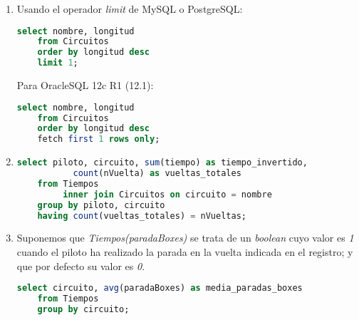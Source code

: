 \begin{enumerate}
	\item 
	Usando el operador \textit{limit} de MySQL o PostgreSQL:
	\begin{lstlisting}[language=sql]
	select nombre, longitud
	from Circuitos
	order by longitud desc
	limit 1;
	\end{lstlisting}
	
	Para OracleSQL 12c R1 (12.1):
	\begin{lstlisting}[language=sql]
	select nombre, longitud
	from Circuitos
	order by longitud desc
	fetch first 1 rows only;
	\end{lstlisting}
	
	\item
	\begin{lstlisting}[language=sql]
	select piloto, circuito, sum(tiempo) as tiempo_invertido, 
		   count(nVuelta) as vueltas_totales
	from Tiempos
		 inner join Circuitos on circuito = nombre
	group by piloto, circuito
	having count(vueltas_totales) = nVueltas;
	\end{lstlisting}
	
	\newpage
	\item
	Suponemos que \textit{Tiempos(paradaBoxes)} se trata de un \textit{boolean} cuyo valor
	es \textit{1} cuando el piloto ha realizado la parada en la vuelta indicada en el
	registro; y que por defecto su valor es \textit{0}.
	\begin{lstlisting}[language=sql]
	select circuito, avg(paradaBoxes) as media_paradas_boxes
	from Tiempos
	group by circuito;
	\end{lstlisting}
\end{enumerate}